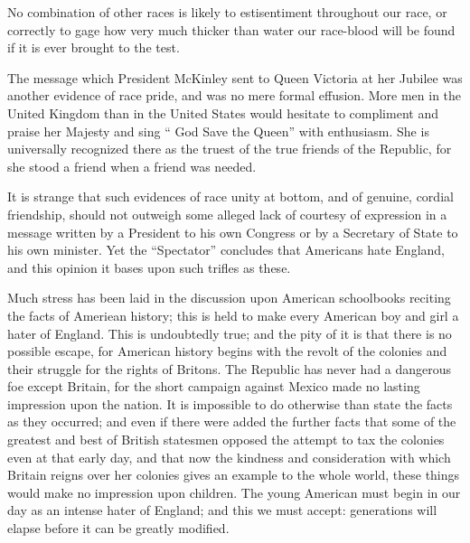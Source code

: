 \documentclass[11pt,openany]{book}
\begin{document}
No combination of other races is likely to estisentiment throughout our race, or correctly to gage how very much thicker than water our race-blood will be found if it is ever brought to the test.

The message which President McKinley sent to Queen Victoria at her Jubilee was another evidence of race pride, and was no mere formal effusion. More men in the United Kingdom than in the United States would hesitate to compliment and praise her Majesty and sing `` God Save the Queen'' with enthusiasm. She is universally recognized there as the truest of the true friends of the Republic, for she stood a friend when a friend was needed.

It is strange that such evidences of race unity at bottom, and of genuine, cordial friendship, should not outweigh some alleged lack of courtesy of expression in a message written by a President to his own Congress or by a Secretary of State to his own minister. Yet the ``Spectator'' concludes that Americans hate England, and this opinion it bases upon such trifles as these.

Much stress has been laid in the discussion upon American schoolbooks reciting the facts of Ameriean history; this is held to make every American boy and girl a hater of England. This is undoubtedly true; and the pity of it is that there is no possible escape, for American history begins with the revolt of the colonies and their struggle for the rights of Britons. The Republic has never had a dangerous foe except Britain, for the short campaign against Mexico made no lasting impression upon the nation. It is impossible to do otherwise than state the facts as they occurred; and even if there were added the further facts that some of the greatest and best of British statesmen opposed the attempt to tax the colonies even at that early day, and that now the kindness and consideration with which Britain reigns over her colonies gives an example to the whole world, these things would make no impression upon children. The young American must begin in our day as an intense hater of England; and this we must accept: generations will elapse before it can be greatly modified.
\end{document}

